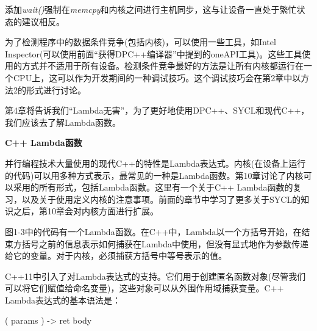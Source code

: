 添加\textit{wait()}强制在\textit{memcpy}和内核之间进行主机同步，这与让设备一直处于繁忙状态的建议相反。\par

为了检测程序中的数据条件竞争(包括内核)，可以使用一些工具，如Intel Inspector(可以使用前面“获得DPC++编译器”中提到的oneAPI工具)。这些工具使用的方式并不适用于所有设备。检测条件竞争最好的方法是让所有内核都运行在一个CPU上，这可以作为开发期间的一种调试技巧。这个调试技巧会在第2章中以方法2的形式进行讨论。\par

\begin{tcolorbox}[colback=red!5!white,colframe=red!75!black]
第4章将告诉我们“Lambda无害”，为了更好地使用DPC++、SYCL和现代C++，我们应该去了解Lambda函数。
\end{tcolorbox}

\hspace*{\fill} \par %
\textbf{C++ Lambda函数}

并行编程技术大量使用的现代C++的特性是Lambda表达式。内核(在设备上运行的代码)可以用多种方式表示，最常见的一种是Lambda函数。第10章讨论了内核可以采用的所有形式，包括Lambda函数。这里有一个关于C++ Lambda函数的复习，以及关于使用定义内核的注意事项。前面的章节中学习了更多关于SYCL的知识之后，第10章会对内核方面进行扩展。\par

图1-3中的代码有一个Lambda函数。在C++中，Lambda以一个方括号开始，在结束方括号之前的信息表示如何捕获在Lambda中使用，但没有显式地作为参数传递给它的变量。对于内核，必须捕获方括号中等号表示的值。\par

C++11中引入了对Lambda表达式的支持。它们用于创建匿名函数对象(尽管我们可以将它们赋值给命名变量)，这些对象可以从外围作用域捕获变量。C++ Lambda表达式的基本语法是：\par

\begin{tcolorbox} ( params ) -> ret { body }
\end{tcolorbox}

